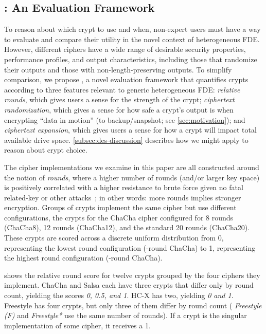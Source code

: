 \subsection{\sysC: An Evaluation Framework}\label{subsec:des-trade}

To reason about which crypt to use and when, non-expert users must have a way to
evaluate and compare their utility in the novel context of heterogeneous FDE.
However, different ciphers have a wide range of desirable security properties,
performance profiles, and output characteristics, including those that randomize
their outputs and those with non-length-preserving outputs. To simplify
comparison, we propose \sysC, a novel evaluation framework that quantifies
crypts according to three features relevant to generic heterogeneous FDE: {\em
relative rounds}, which gives users a sense for the strength of the crypt; {\em
ciphertext randomization}, which gives a sense for how safe a crypt's output is
when encrypting ``data in motion'' (\eg to backup/snapshot; see
\cref{sec:motivation}); and {\em ciphertext expansion}, which gives users a
sense for how a crypt will impact total available drive space.
\cref{subsec:des-discussion} describes how we might apply \sysC to reason about
crypt choice.




 The cipher implementations we examine in this
paper are all constructed around the notion of {\em rounds}, where a higher
number of rounds (and/or larger key space) is positively correlated with a
higher resistance to brute force given no fatal related-key or other
attacks~\cite{ChaCha-Cryptanalysis}; in other words: more rounds implies
stronger encryption. Groups of crypts implement the same cipher but use
different configurations, \eg the crypts for the ChaCha cipher configured for 8
rounds (ChaCha8), 12 rounds (ChaCha12), and the standard 20 rounds (ChaCha20).
These crypts are scored across a discrete uniform distribution from 0,
representing the lowest round configuration (-round ChaCha) to 1,
representing the highest round configuration (-round ChaCha).

 shows the relative round score for twelve crypts
grouped by the four ciphers they implement. ChaCha and Salsa each have
three crypts that differ only by round count, yielding the scores {\em
0, 0.5, and 1}. HC-X has two, yielding {\em 0 and 1}. Freestyle has
four crypts, but only three of them differ by round count ({\em
Freestyle (F)} and {\em Freestyle*} use the same number of rounds). If
a crypt is the singular implementation of some cipher, it receives a
1.

